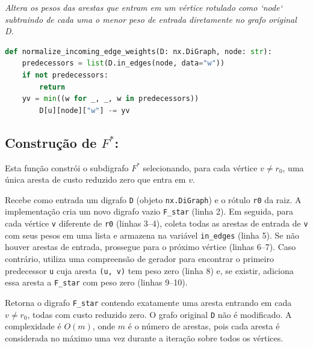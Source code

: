 \begin{tcolorbox}[
        enhanced, breakable,
        colframe=blue!60!black, colback=blue!2,
        colbacktitle=blue!15, coltitle=black,
        title={Normalização por vértice: custos reduzidos},
        boxed title style={sharp corners, boxrule=0.6pt},
        sharp corners, boxrule=0.6pt
    ]
    \emph{Altera os pesos das arestas que entram em um vértice rotulado como `node` subtraindo de cada uma o menor peso de entrada diretamente no grafo original D.}
    \tcblower
    \begin{lstlisting}[language=Python]
def normalize_incoming_edge_weights(D: nx.DiGraph, node: str):    
    predecessors = list(D.in_edges(node, data="w"))
    if not predecessors:
        return
    yv = min((w for _, _, w in predecessors))
        D[u][node]["w"] -= yv   
\end{lstlisting}
\end{tcolorbox}


\subsection{Construção de \(F^*\):}
Esta função constrói o subdigrafo \(F^*\) selecionando, para cada vértice \(v\neq r_0\), uma única aresta de custo reduzido zero que entra em \(v\).

Recebe como entrada um digrafo \texttt{D} (objeto \texttt{nx.DiGraph}) e o rótulo \texttt{r0} da raiz. A implementação cria um novo digrafo vazio \texttt{F\_star} (linha 2). Em seguida, para cada vértice \texttt{v} diferente de \texttt{r0} (linhas 3--4), coleta todas as arestas de entrada de \texttt{v} com seus pesos em uma lista e armazena na variável \texttt{in\_edges} (linha 5). Se não houver arestas de entrada, prossegue para o próximo vértice (linhas 6--7). Caso contrário, utiliza uma compreensão de gerador para encontrar o primeiro predecessor \texttt{u} cuja aresta \texttt{(u, v)} tem peso zero (linha 8) e, se existir, adiciona essa aresta a \texttt{F\_star} com peso zero (linhas 9--10).

Retorna o digrafo \texttt{F\_star} contendo exatamente uma aresta entrando em cada \(v\neq r_0\), todas com custo reduzido zero. O grafo original \texttt{D} não é modificado. A complexidade é \(O(m)\), onde \(m\) é o número de arestas, pois cada aresta é considerada no máximo uma vez durante a iteração sobre todos os vértices.

